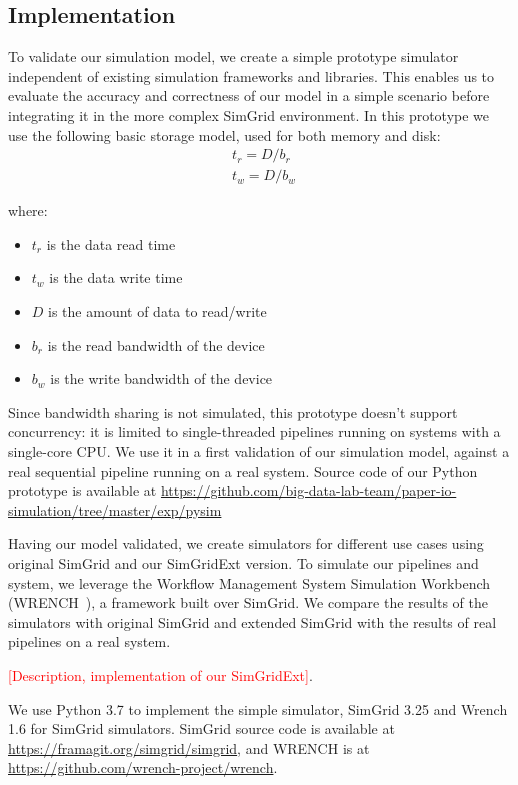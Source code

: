 \documentclass[conference]{IEEEtran}
\begin{document}
		\subsection{Implementation}

			To validate our simulation model, we create a simple prototype
			simulator independent of existing simulation frameworks and libraries. 
			This enables us to evaluate the accuracy and correctness of our 
			model in a simple scenario before integrating it in the more complex SimGrid environment. 
			In this prototype we use the following basic storage model, used for both memory and disk: 
			\begin{align*}
				& t_{r} = D / b_r \\ 
				& t_{w} = D / b_w\
			\end{align*}		
			
			where:
			\begin{itemize}
				\item $t_{r}$ is the data read time
				\item $t_{w}$ is the data write time
				\item $D$ is the amount of data to read/write
				\item $b_r$ is the read bandwidth of the device
				\item $b_w$ is the write bandwidth of the device
			\end{itemize}			

			Since bandwidth sharing is not simulated, this prototype doesn't support 
			concurrency: it is limited to single-threaded pipelines running on systems 
			with a single-core CPU. We use it in a first validation of our simulation 
			model, against a real sequential pipeline running on a real system.
			Source code of our Python prototype is available at 
            \url{https://github.com/big-data-lab-team/paper-io-simulation/tree/master/exp/pysim}
			
			Having our model validated, we create simulators for different use cases 
			using original SimGrid and our SimGridExt version. 
			To simulate our pipelines and system, we leverage 
			the Workflow Management System Simulation Workbench 
			(WRENCH~\cite{wrench2018}), a framework built over SimGrid.
		    We compare the results of the simulators with
			original SimGrid and extended SimGrid with the results of real
			pipelines on a real system. 
			
			\textcolor{red}{[Description, implementation of our SimGridExt]}. 
		
			We use Python 3.7 to implement the simple simulator, SimGrid 3.25
			and Wrench 1.6 for SimGrid simulators. SimGrid source code is
			available at \url{https://framagit.org/simgrid/simgrid}, and WRENCH
			is at \url{https://github.com/wrench-project/wrench}.
			
\end{document}

